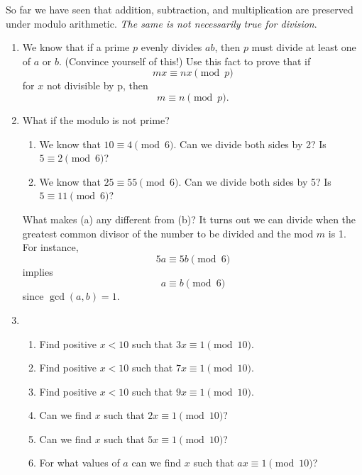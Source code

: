 \documentclass[11pt]{article}
\theoremstyle{definition}
\begin{document}
So far we have seen that addition, subtraction, and multiplication
are preserved under modulo arithmetic. \textit{The same is not
necessarily true for division}.

\begin{enumerate} \addtocounter{enumi}{\value{problem_count}}

\item \addtocounter{problem_count}{1}
We know that if a prime $p$ evenly divides $ab$, then $p$ must divide at least one of $a$ or $b$. (Convince yourself of this!) Use this fact to prove that if
\[mx \equiv nx \pmod{p}\]
for $x$ not divisible by p, then
\[m \equiv n \pmod{p}.\]

\item \addtocounter{problem_count}{1}
What if the modulo is not prime?
\begin{enumerate}
\item We know that $10 \equiv 4 \pmod{6}$. Can we divide both sides by 2? Is
$5 \equiv 2 \pmod{6}$?
\item We know that $25 \equiv 55 \pmod{6}$. Can we divide both sides by 5? Is
$5 \equiv 11 \pmod{6}$?
\end{enumerate}
What makes (a) any different from (b)? It turns out we can divide
when the greatest common divisor of the number to be divided and the mod $m$ is 1. For instance,
\[ 5a \equiv 5b \pmod{6} \]
implies
\[ a \equiv b \pmod{6} \]
since $\gcd( a, b ) = 1.$

\item \addtocounter{problem_count}{1}
\begin{enumerate}
\item Find positive $x < 10$ such that $3x \equiv 1 \pmod{10}$.
\item Find positive $x < 10$ such that $7x \equiv 1 \pmod{10}$.
\item Find positive $x < 10$ such that $9x \equiv 1 \pmod{10}$.
\item Can we find $x$ such that $2x \equiv 1 \pmod{10}$?
\item Can we find $x$ such that $5x \equiv 1 \pmod{10}$?
\item For what values of $a$ can we find $x$ such that $ax \equiv 1 \pmod{10}$?
\end{enumerate}
\end{enumerate}
\end{document}

